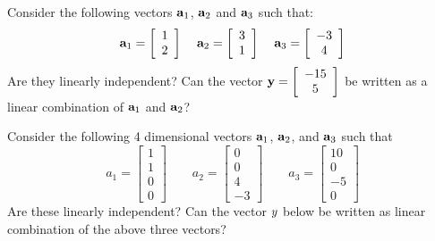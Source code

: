 \begin{problem}
\label{2009_a5_1}
Consider the following vectors ${\bf a}_1$, ${\bf a}_2$ and ${\bf a}_3$ such that:
\[{\bf a}_1 = \left[\begin{array}{c}
1\\
2
\end{array}\right]\hspace{4mm}{\bf a}_2 = \left[\begin{array}{c}
3\\
1
\end{array}\right]\hspace{4mm}{\bf a}_3 = \left[\begin{array}{c}
-3\\
4
\end{array}\right]\]
Are they linearly independent? Can the vector ${\bf y}=\left[\begin{array}{c} -15\\ 5\end{array}\right]$ be written as a linear combination of ${\bf a}_1$ and ${\bf a}_2$?
\end{problem}

\begin{problem}
\label{2009_a5_2}
Consider the following 4 dimensional vectors $\aa_1$, $\aa_2$, and $\aa_3$ such that
$$
a_1 = \left[\begin{array}{c} 1\\1\\0\\0 \end{array}\right] \qquad
a_2 = \left[\begin{array}{c} 0\\0\\4\\-3 \end{array}\right] \qquad
a_3 = \left[\begin{array}{c} 10\\0\\-5\\0 \end{array}\right]
$$
Are these linearly independent? Can the vector $\boldmath{y}$ below be written as  linear combination of the above three vectors?

\end{problem}


